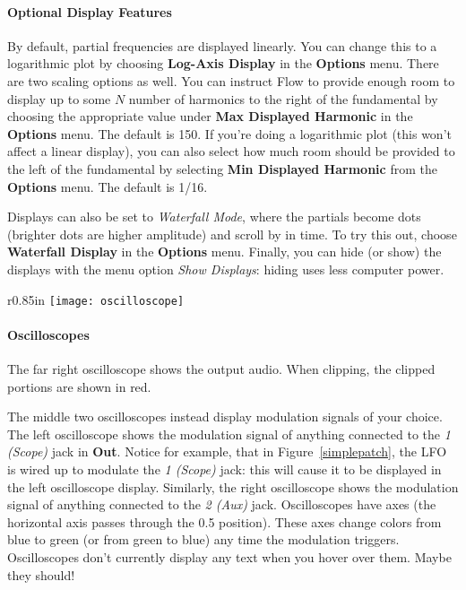 \documentclass{article}
\begin{document}
\paragraph{Optional Display Features}
By default, partial frequencies are displayed linearly.  You can change this to a logarithmic plot by choosing {\bf Log-Axis Display} in the {\bf Options} menu.  There are two scaling options as well.  You can instruct Flow to provide enough room to display up to some \(N\) number of harmonics to the right of the fundamental by choosing the appropriate value under {\bf Max Displayed Harmonic} in the {\bf Options} menu.  The default is 150. If you're doing a logarithmic plot (this won't affect a linear display), you can also select how much room should be provided to the left of the fundamental by selecting {\bf Min Displayed Harmonic} from the {\bf Options} menu.  The default is 1/16.

Displays can also be set to {\it Waterfall Mode}, where the partials become dots (brighter dots are higher amplitude) and scroll by in time.  To try this out, choose {\bf Waterfall Display} in the {\bf Options} menu.  Finally, you can hide (or show) the displays with the menu option {\it Show Displays}: hiding uses less computer power.

\begin{wrapfigure}{r}{0.85in}
\vspace{-1em}
\texttt{[image: oscilloscope]}
\vspace{-1.5em}
\caption{An\newline Oscilloscope}
\vspace{-1em}
\label{oscilloscope}
\end{wrapfigure}

\paragraph{Oscilloscopes}
The far right oscilloscope shows the output audio.  When clipping, the clipped portions are shown in red.  

The middle two oscilloscopes instead display modulation signals of your choice. The left oscilloscope shows the modulation signal of anything connected to the {\it 1 (Scope)} jack in {\bf Out}.  Notice for example, that in Figure~\ref{simplepatch}, the LFO is wired up to modulate the {\it 1 (Scope)} jack: this will cause it to be displayed in the left oscilloscope display.  Similarly, the right oscilloscope shows the modulation signal of anything connected to the {\it 2 (Aux)} jack.  Oscilloscopes have axes (the horizontal axis passes through the 0.5 position).  These axes change colors from blue to green (or from green to blue) any time the modulation triggers.  Oscilloscopes don't currently display any text when you hover over them.  Maybe they should!
\end{document}
